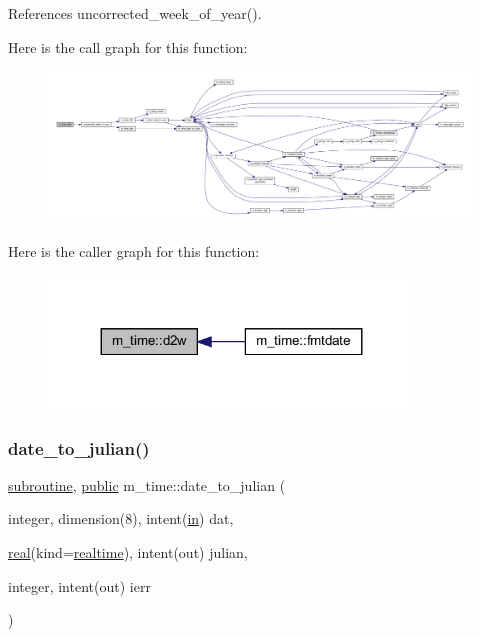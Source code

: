 References uncorrected\+\_\+week\+\_\+of\+\_\+year().

Here is the call graph for this function\+:
\nopagebreak
\begin{figure}[H]
\begin{center}
\leavevmode
\includegraphics[width=350pt]{namespacem__time_ad4ff99ad6f6d5282c4b65ad636a2a627_cgraph}
\end{center}
\end{figure}
Here is the caller graph for this function\+:
\nopagebreak
\begin{figure}[H]
\begin{center}
\leavevmode
\includegraphics[width=275pt]{namespacem__time_ad4ff99ad6f6d5282c4b65ad636a2a627_icgraph}
\end{center}
\end{figure}
\mbox{\label{namespacem__time_acfdc970b4154b0c15bd33727636e3992}} 
\subsubsection{\texorpdfstring{date\+\_\+to\+\_\+julian()}{date\_to\_julian()}}
{\footnotesize\ttfamily \hyperlink{M__stopwatch_83_8txt_acfbcff50169d691ff02d4a123ed70482}{subroutine}, \hyperlink{M__stopwatch_83_8txt_a2f74811300c361e53b430611a7d1769f}{public} m\+\_\+time\+::date\+\_\+to\+\_\+julian (\begin{DoxyParamCaption}\item[{integer, dimension(8), intent(\hyperlink{M__journal_83_8txt_afce72651d1eed785a2132bee863b2f38}{in})}]{dat,  }\item[{\hyperlink{read__watch_83_8txt_abdb62bde002f38ef75f810d3a905a823}{real}(kind=\hyperlink{namespacem__time_ac10ea9e8d59ec74eaa7d89f2517d7422}{realtime}), intent(out)}]{julian,  }\item[{integer, intent(out)}]{ierr }\end{DoxyParamCaption})}



